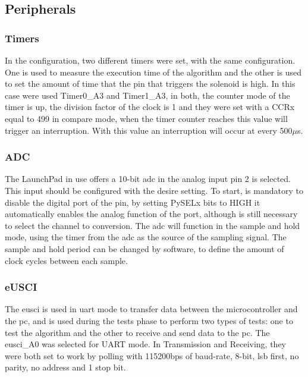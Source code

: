 \subsection{Peripherals}
\subsubsection*{Timers}
In the configuration, two different timers were set, with the same configuration. One is used to measure the execution time of the algorithm and the other is used to set the amount of time that the pin that triggers the solenoid is high. In this case were used Timer0\_A3 and Timer1\_A3, in both, the counter mode of the timer is up, the division factor of the clock is 1 and they were set with a CCRx equal to 499 in compare mode, when the timer counter reaches this value will trigger an interruption. With this value an interruption will occur at every 500$\mu$s. %

\subsubsection*{ADC}
The LaunchPad in use offers a 10-bit \acrshort{adc} in the analog input pin 2 is selected. This input should be configured with the desire setting. To start, is mandatory to disable the digital port of the pin, by setting PySELx bits to HIGH it automatically enables the analog function of the port, although is still necessary to select the channel to conversion. The \acrshort{adc} will function in the sample and hold mode, using the timer from the \acrshort{adc} as the source of the sampling signal. The sample and hold period can be changed by software, to define the amount of clock cycles between each sample.
 
\subsubsection*{eUSCI}
The \acrshort{eusci} is used in \acrshort{uart} mode to transfer data between the microcontroller and the \acrshort{pc}, and is used during the tests phase to perform two types of tests: one to test the algorithm and the other to receive and send data to the \acrshort{pc}. The \acrshort{eusci}\_A0 was selected for UART mode. In Transmission and Receiving, they were both set to work by polling with 115200bps of
baud-rate, 8-bit, \acrshort{lsb} first, no parity, no address and 1 stop bit.


